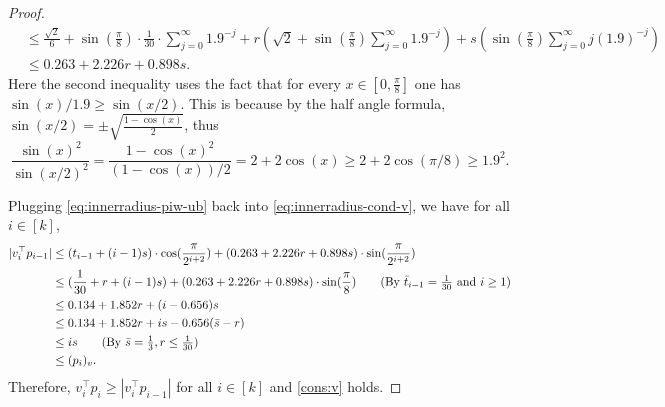 \documentclass{theoretics}
\begin{document}
\begin{proof}
\begin{align}
        &\leq \frac{\sqrt{2}}{6} + \sin(\frac{\pi}{8}) \cdot 
    \frac{1}{30} \cdot \sum_{j=0}^{\infty} 1.9^{-j} + r\left(\sqrt{2} + \sin(\frac{\pi}{8})\sum_{j=0}^{\infty} 1.9^{-j}\right) +  s\left(\sin(\frac{\pi}{8}) \sum_{j=0}^{\infty} j(1.9)^{-j} \right) \nonumber \\
        &\leq 0.263 + 2.226r + 0.898s. \label{eq:innerradius-piw-ub}
    \end{align}
    Here the second inequality uses the fact that for every $x \in [0, \frac{\pi}{8}]$ one has $\sin(x)/1.9 \geq \sin(x/2)$.
    This is because by the half angle formula, $\sin(x/2) = \pm\sqrt{\frac{1-\cos(x)}{2}}$, thus
    \[
        \frac{\sin(x)^2}{\sin(x/2)^2} = \frac{1-\cos(x)^2}{(1-\cos(x))/2} = 2 + 2\cos(x) \geq 2 + 2\cos(\pi/8) \geq 1.9^2.
    \]

    Plugging \eqref{eq:innerradius-piw-ub} back into \eqref{eq:innerradius-cond-v}, we have for all $i \in [k]$,
    \begin{align*}
        |v_i^\top p_{i-1}| &\leq (t_{i-1} + (i-1)s) \cdot \cos(\frac{\pi}{2^{i + 2}}) +  (0.263 + 2.226r + 0.898s) \cdot \sin(\frac{\pi}{2^{i+2}}) \\
        &\leq ( \frac{1}{30} + r + (i-1)s) + ( 0.263 + 2.226r + 0.898s) \cdot \sin(\frac{\pi}{8}) \tag{By $\bar{t}_{i-1} = \frac{1}{30}$ and $i \geq 1$} \\
        &\leq 0.134 + 1.852r + (i - 0.656)s \\
        &\leq 0.134 + 1.852r + is - 0.656(\bar{s} - r)  \\
        &\leq is \tag{By $\bar{s} = \frac{1}{3}, r\leq \frac{1}{30}$} \\
        &\leq (p_i)_v.
    \end{align*}
    Therefore, $v_i^\top p_i \geq |v_i^\top p_{i-1}|$ for all $i \in [k]$ and \eqref{cons:v} holds.
    

\end{proof}
\end{document}
